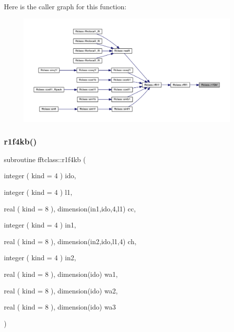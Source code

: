 Here is the caller graph for this function\+:\nopagebreak
\begin{figure}[H]
\begin{center}
\leavevmode
\includegraphics[width=350pt]{namespacefftclass_a382f39146e7d8e1450810efdc6f4cd79_icgraph}
\end{center}
\end{figure}
\mbox{\label{namespacefftclass_a71f9b9a5e0173f9ddef4dd0fc92e6164}} 
\subsubsection{\texorpdfstring{r1f4kb()}{r1f4kb()}}
{\footnotesize\ttfamily subroutine fftclass\+::r1f4kb (\begin{DoxyParamCaption}\item[{integer ( kind = 4 )}]{ido,  }\item[{integer ( kind = 4 )}]{l1,  }\item[{real ( kind = 8 ), dimension(in1,ido,4,l1)}]{cc,  }\item[{integer ( kind = 4 )}]{in1,  }\item[{real ( kind = 8 ), dimension(in2,ido,l1,4)}]{ch,  }\item[{integer ( kind = 4 )}]{in2,  }\item[{real ( kind = 8 ), dimension(ido)}]{wa1,  }\item[{real ( kind = 8 ), dimension(ido)}]{wa2,  }\item[{real ( kind = 8 ), dimension(ido)}]{wa3 }\end{DoxyParamCaption})}


